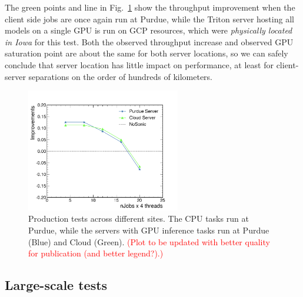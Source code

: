 The green points and line in Fig.~\ref{fig:crosssites} show the throughput improvement when the client side jobs are once again run at Purdue, while the Triton server hosting all models on a single GPU is run on GCP resources, which were \textit{physically located in Iowa} for this test. Both the observed throughput increase and observed GPU saturation point are about the same for both server locations, so we can safely conclude that server location has little impact on performance, at least for client-server separations on the order of hundreds of kilometers.


\begin{figure}[htp]
    \centering
    \includegraphics[width=0.60\textwidth]{plots/cloud_vs_purdue.png}
    \caption{Production tests across different sites. The CPU tasks run at Purdue, while the servers with GPU inference tasks run at Purdue (Blue) and Cloud (Green). \textcolor{red}{(Plot to be updated with better quality for publication (and better legend?).)}}
    \label{fig:crosssites}
\end{figure}

\subsection{Large-scale tests}
\label{sec:scale_out}

